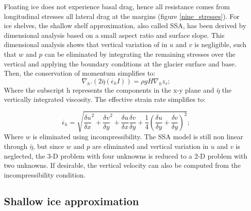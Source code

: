 \documentclass{article}
\begin{document}
Floating ice does not experience basal drag, hence all resistance comes from longitudinal stresses all lateral drag at the margins (figure \ref{nine_stresses}). For ice shelves, the shallow shelf approximation, also called SSA, has been derived by dimensional analysis based on a small aspect ratio and surface slope. This dimensional analysis shows that vertical variation of in $u$ and $v$ is negligible, such that $w$ and $p$ can be eliminated by integrating the remaining stresses over the vertical and applying the boundary conditions at the glacier surface and base. Then, the conservation of momentum simplifies to:
\begin{equation}
	\nabla_h.(2\bar{\eta}(\dot{\epsilon_h}I))=\rho g H \nabla_h z_s;
\end{equation}
Where the subscript h represents the components in the x-y plane and $\bar{\eta}$ the vertically integrated viscosity. The effective strain rate simplifies to:

\begin{equation}
	\dot{\epsilon_h}=\sqrt{{\frac{\delta u}{\delta x}}^2+{\frac{\delta v}{\delta y}}^2+\frac{\delta u}{\delta x}\frac{\delta v}{\delta y}+\frac{1}{4}{(\frac{\delta u}{\delta y}+\frac{\delta v}{\delta y})}^2};
\end{equation}
Where $w$ is eliminated using incompressibility. The SSA model is still non linear through $\bar{\eta}$, but since $w$ and $p$ are eliminated and vertical variation in $u$ and $v$ is neglected, the 3-D problem with four unknowns is reduced to a 2-D problem with two unknowns. If desirable, the vertical velocity can also be computed from the incompressibility condition. 

\subsection{Shallow ice approximation}
\end{document}
